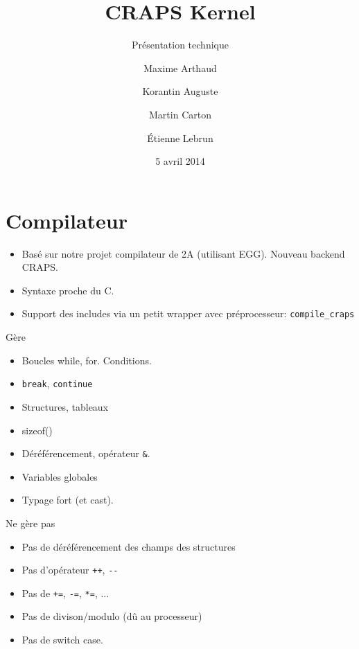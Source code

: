 \documentclass{beamer}
\title{CRAPS Kernel}
\subtitle{Présentation technique}
\author{
       Maxime Arthaud
  \and Korantin Auguste
  \and Martin Carton
  \and Étienne Lebrun
}
\date{5 avril 2014}
\begin{document}
  \begin{frame}
    \titlepage%
  \end{frame}

  \section{Compilateur}

  \begin{frame}[fragile]
      \begin{itemize}
          \item Basé sur notre projet compilateur de 2A (utilisant EGG). Nouveau backend CRAPS.
          \item Syntaxe proche du C.
          \item Support des includes via un petit wrapper avec préprocesseur: \verb+compile_craps+
      \end{itemize}
\end{frame}

  \begin{frame}[fragile]{Gère}
      \begin{itemize}
          \item Boucles while, for. Conditions.
          \item \verb+break+, \verb+continue+
          \item Structures, tableaux
          \item sizeof()
          \item Déréférencement, opérateur \verb+&+.
          \item Variables globales
          \item Typage fort (et cast).
      \end{itemize}
\end{frame}

 \begin{frame}[fragile]{Ne gère pas}
      \begin{itemize}
          \item Pas de déréférencement des champs des structures
          \item Pas d'opérateur \verb|++|, \verb|--|
          \item Pas de \verb|+=|, \verb|-=|, \verb|*=|, ...
          \item Pas de divison/modulo (dû au processeur)
          \item Pas de switch case.
      \end{itemize}
\end{frame}
\end{document}
